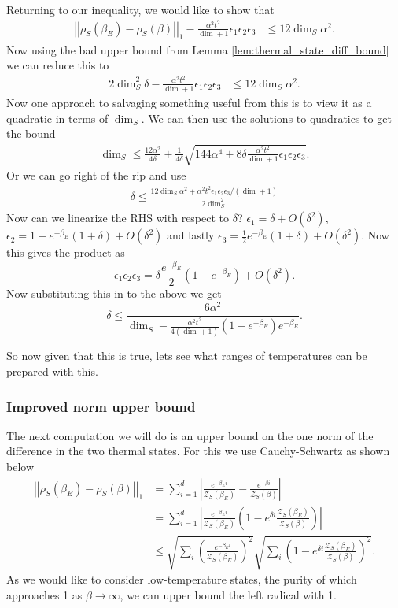 \documentclass{article}
\newcommand{\parens}[1]{\left( #1 \right)}
\newcommand{\abs}[1]{\left| #1 \right|}
\newcommand{\norm}[1]{\left| \left| #1 \right| \right|}
\newcommand{\bigo}[1]{O\left( #1 \right)}
\newcommand{\partfun}{\mathcal{Z}}
\begin{document}
Returning to our inequality, we would like to show that 
\begin{align}
    \norm{\rho_S(\beta_E) - \rho_S(\beta)}_1 - \frac{\alpha^2 t^2}{\dim + 1} \epsilon_1 \epsilon_2 \epsilon_3 &\leq 12 \dim_S \alpha^2.
\end{align}
Now using the bad upper bound from Lemma \ref{lem:thermal_state_diff_bound} we can reduce this to
\begin{align}
    2\dim_S^2 \delta - \frac{\alpha^2 t^2}{\dim + 1} \epsilon_1 \epsilon_2 \epsilon_3 &\leq 12 \dim_S \alpha^2.
\end{align}
Now one approach to salvaging something useful from this is to view it as a quadratic in terms of $\dim_S$. We can then use the solutions to quadratics to get the bound
\begin{align}
    \dim_S \le \frac{12 \alpha^2}{4 \delta} + \frac{1}{4 \delta}\sqrt{144 \alpha^4 + 8 \delta \frac{\alpha^2 t^2}{\dim+ 1}\epsilon_1 \epsilon_2 \epsilon_3}.
\end{align}
Or we can go right of the rip and use
\begin{align}
    \delta \le \frac{12 \dim_S \alpha^2 + \alpha^2 t^2 \epsilon_1 \epsilon_2 \epsilon_3 / (\dim+1)}{2 \dim_S^2}
\end{align}
Now can we linearize the RHS with respect to $\delta$? $\epsilon_1 = \delta +\bigo{\delta^2}$, $\epsilon_2 = 1 - e^{-\beta_E}( 1 + \delta) + \bigo{\delta^2} $ and lastly $\epsilon_3 = \frac{1}{2} e^{-\beta_E}(1 + \delta) + \bigo{\delta^2}$. Now this gives the product as $$ \epsilon_1 \epsilon_2 \epsilon_3 = \delta \frac{e^{-\beta_E}}{2}(1 - e^{-\beta_E}) + \bigo{\delta^2}. $$ Now substituting this in to the above we get
$$\delta \le \frac{6 \alpha^2}{\dim_S - \frac{\alpha^2 t^2}{4 (\dim + 1)} (1 - e^{-\beta_E})e^{-\beta_E}}.$$

So now given that this is true, lets see what ranges of temperatures can be prepared with this. 


\subsubsection{Improved norm upper bound}
The next computation we will do is an upper bound on the one norm of the difference in the two thermal states. For this we use Cauchy-Schwartz as shown below
\begin{align}
    \norm{\rho_S(\beta_E) - \rho_S(\beta)}_1 &= \sum_{i = 1}^{d} \abs{\frac{e^{-\beta_E i}}{\partfun_S(\beta_E)} - \frac{e^{-\beta i}}{\partfun_S(\beta)}} \\
    &= \sum_{i = 1}^{d} \abs{\frac{e^{-\beta_E i}}{\partfun_S(\beta_E)} \parens{1 - e^{\delta i } \frac{\partfun_S(\beta_E)}{\partfun_S(\beta)}}} \\
    &\le \sqrt{\sum_i \parens{\frac{e^{-\beta_E i}}{\partfun_S(\beta_E)}}^2} \sqrt{\sum_i \parens{1 - e^{\delta i } \frac{\partfun_S(\beta_E)}{\partfun_S(\beta)}}^2}.
\end{align}
As we would like to consider low-temperature states, the purity of which approaches 1 as $\beta \to \infty$, we can upper bound the left radical with 1. 
\end{document}
